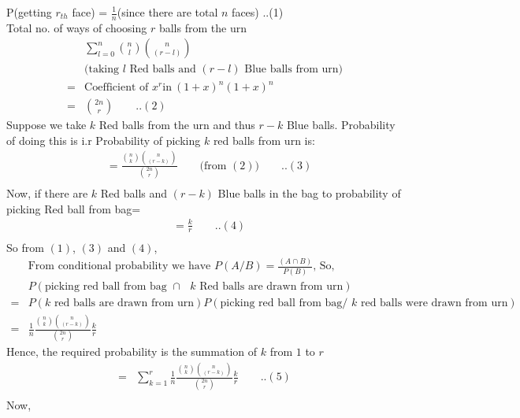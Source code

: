 \documentclass[12pt]{article}
\begin{document}
    \begin{solution}
        P(getting $r_{th}$ face) = $\frac{1}{n}$(since there are total $n$ faces)          ..(1)\\
        Total no. of ways of choosing $r$ balls from the urn
        \begin{align*}
            &\sum_{l=0}^{n}{n \choose l}{n \choose (r-l)}\quad\quad \\
            &\text{(taking $l$ Red balls and $(r-l)$ Blue balls from urn)}\\
            = & \text{Coefficient of } x^r \text{in} \:(1+x)^n(1+x)^n\\
            = & {2n \choose r} \quad\quad ..(2)
        \end{align*}
        Suppose we take $k$ Red balls from the urn and thus $r-k$ Blue balls. Probability of doing this is i.r Probability of picking $k$ red balls from urn is:
        \begin{align*}
            & =\frac{{n \choose k}{n \choose (r-k)}}{{2n \choose r}}\quad\quad \text{(from $(2)$)}\quad\quad..(3)\\
        \end{align*}
        Now, if there are $k$ Red balls and $(r-k)$ Blue balls in the bag to probability of picking Red ball from bag= 
        \begin{align*}
            & =\frac{k}{r}\quad\quad ..(4)\\
        \end{align*}
        So from $(1)$, $(3)$ and $(4)$,
        \begin{align*}
        & \text{From conditional probability we have $P(A/B)=\frac{(A \cap B)}{P(B)}$, So,}\\
        & P(\text{picking red ball from bag $\cap$ $k$ Red balls are drawn from urn})\\
        =&P(\text{$k$ red balls are drawn from urn})P(\text{picking red ball from bag/ $k$ red balls were drawn from urn})\\
        = & \frac{1}{n}\frac{{n \choose k}{n \choose (r-k)}}{{2n \choose r}}\frac{k}{r}
        \end{align*}
        Hence, the required probability is the summation of $k$ from $1$ to $r$
        \begin{align*}
            = & \sum_{k=1}^{r}\frac{1}{n}\frac{{n \choose k}{n \choose (r-k)}}{{2n \choose r}}\frac{k}{r}\quad\quad..(5)\\
        \end{align*}
        Now,

\end{solution}
\end{document}
